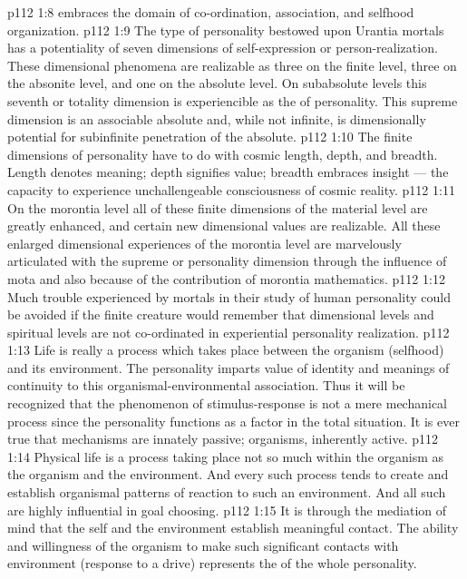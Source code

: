 \vs p112 1:8 \pc {}\bibnobreakspace {} embraces the domain of co\hyp{}ordination, association, and selfhood organization.
\vs p112 1:9 \pc The type of personality bestowed upon Urantia mortals has a potentiality of seven dimensions of self\hyp{}expression or person\hyp{}realization. These dimensional phenomena are realizable as three on the finite level, three on the absonite level, and one on the absolute level. On subabsolute levels this seventh or totality dimension is experiencible as the  of personality. This supreme dimension is an associable absolute and, while not infinite, is dimensionally potential for subinfinite penetration of the absolute.
\vs p112 1:10 The finite dimensions of personality have to do with cosmic length, depth, and breadth. Length denotes meaning; depth signifies value; breadth embraces insight --- the capacity to experience unchallengeable consciousness of cosmic reality.
\vs p112 1:11 On the morontia level all of these finite dimensions of the material level are greatly enhanced, and certain new dimensional values are realizable. All these enlarged dimensional experiences of the morontia level are marvelously articulated with the supreme or personality dimension through the influence of mota and also because of the contribution of morontia mathematics.
\vs p112 1:12 Much trouble experienced by mortals in their study of human personality could be avoided if the finite creature would remember that dimensional levels and spiritual levels are not co\hyp{}ordinated in experiential personality realization.
\vs p112 1:13 \pc Life is really a process which takes place between the organism (selfhood) and its environment. The personality imparts value of identity and meanings of continuity to this organismal\hyp{}environmental association. Thus it will be recognized that the phenomenon of stimulus\hyp{}response is not a mere mechanical process since the personality functions as a factor in the total situation. It is ever true that mechanisms are innately passive; organisms, inherently active.
\vs p112 1:14 Physical life is a process taking place not so much within the organism as  the organism and the environment. And every such process tends to create and establish organismal patterns of reaction to such an environment. And all such  are highly influential in goal choosing.
\vs p112 1:15 It is through the mediation of mind that the self and the environment establish meaningful contact. The ability and willingness of the organism to make such significant contacts with environment (response to a drive) represents the  of the whole personality.

